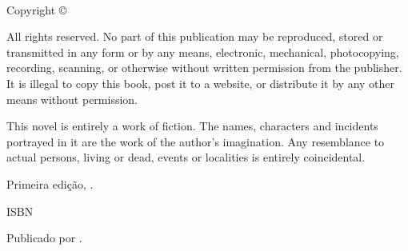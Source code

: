 
{\small
	\setlength{\parindent}{0em}\setlength{\parskip}{1em}
	
	~
	
	\vfill
	
	Copyright \copyright{} \editionyear{} \authorname
	
	All rights reserved. No part of this publication may be reproduced, stored or transmitted in any form or by any means, electronic, mechanical, photocopying, recording, scanning, or otherwise without written permission from the publisher. It is illegal to copy this book, post it to a website, or distribute it by any other means without permission.
	
	This novel is entirely a work of fiction. The names, characters and incidents portrayed in it are the work of the author’s imagination. Any resemblance to actual persons, living or dead, events or localities is entirely coincidental.
	
	Primeira edição, \editionyear{}.
	
	ISBN \isbn{}  %
	
	Publicado por \publisher{}.
}
